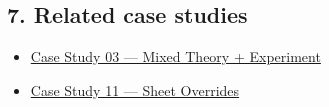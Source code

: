 \documentclass[
  11pt,
]{article}
\providecommand{\tightlist}{
  \setlength{\itemsep}{0pt}\setlength{\parskip}{0pt}}
\begin{document}
\hypertarget{7-related-case-studies}{
\subsection{7. Related case studies}\label{7-related-case-studies}}

\begin{itemize}
\tightlist
\item
  \href{https://github.com/pinarsyt/overlap-calculator/blob/main/case_studies/03_mixed_theory_experiment/README.md}{Case
  Study 03 --- Mixed Theory + Experiment}
\item
  \href{https://github.com/pinarsyt/overlap-calculator/blob/main/case_studies/11_sheet_overrides/README.md}{Case
  Study 11 --- Sheet Overrides}
\end{itemize}
\end{document}
